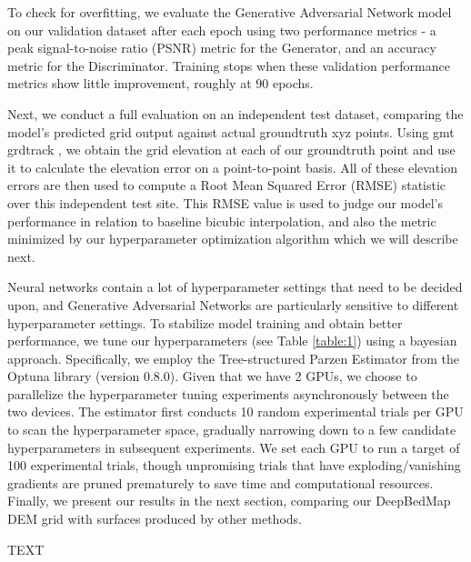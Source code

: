 \documentclass[tc, manuscript]{copernicus}
\begin{document}
To check for overfitting, we evaluate the Generative Adversarial Network model on our validation dataset after each epoch using two performance metrics - a peak signal-to-noise ratio (PSNR) metric for the Generator, and an accuracy metric for the Discriminator.
Training stops when these validation performance metrics show little improvement, roughly at 90 epochs.

Next, we conduct a full evaluation on an independent test dataset, comparing the model's predicted grid output against actual groundtruth xyz points.
Using gmt grdtrack \citep{WesselGenericMappingTools2013}, we obtain the grid elevation at each of our groundtruth point and use it to calculate the elevation error on a point-to-point basis.
All of these elevation errors are then used to compute a Root Mean Squared Error (RMSE) statistic over this independent test site.
This RMSE value is used to judge our model's performance in relation to baseline bicubic interpolation, and also the metric minimized by our hyperparameter optimization algorithm which we will describe next.

Neural networks contain a lot of hyperparameter settings that need to be decided upon, and Generative Adversarial Networks are particularly sensitive to different hyperparameter settings.
To stabilize model training and obtain better performance, we tune our hyperparameters (see Table \ref{table:1}) using a bayesian approach.
Specifically, we employ the Tree-structured Parzen Estimator \citep{BergstraAlgorithmsHyperparameterOptimization2011} from the Optuna library (version 0.8.0).
Given that we have 2 GPUs, we choose to parallelize the hyperparameter tuning experiments asynchronously between the two devices.
The estimator first conducts 10 random experimental trials per GPU to scan the hyperparameter space, gradually narrowing down to a few candidate hyperparameters in subsequent experiments.
We set each GPU to run a target of 100 experimental trials, though unpromising trials that have exploding/vanishing gradients are pruned prematurely to save time and computational resources.
Finally, we present our results in the next section, comparing our DeepBedMap DEM grid with surfaces produced by other methods.


\conclusions  %
TEXT

\end{document}
